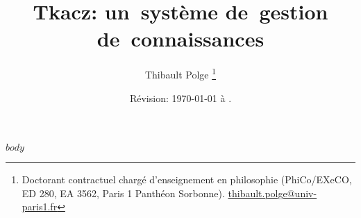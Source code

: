 \documentclass[french]{book}
\begin{document}
\title{Tkacz: un~système de~gestion de~connaissances}

\author{Thibault Polge%
\thanks{Doctorant contractuel chargé d'enseignement en philosophie (PhiCo/EXeCO, ED
280, EA 3562, Paris 1 Panthéon Sorbonne). \protect\href{http://mailto:thibault.polge@univ-paris1.fr}{thibault.polge@univ-paris1.fr}%
}}

\date{Révision: \today{} à \currenttime.}

\maketitle




\tableofcontents

$body$
\end{document}
